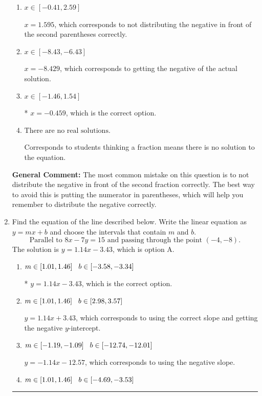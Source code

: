 \documentclass{extbook}[14pt]
\newcommand{\litem}[1]{\item #1

\rule{\textwidth}{0.4pt}}
\begin{document}
\begin{enumerate}
{\begin{enumerate}[label=\Alph*.]
$x = -1.595$, which corresponds to not distributing the negative in front of the first parentheses correctly.
\item \( x \in [-0.41, 2.59] \)

$x = 1.595$, which corresponds to not distributing the negative in front of the second parentheses correctly.
\item \( x \in [-8.43, -6.43] \)

$x = -8.429$, which corresponds to getting the negative of the actual solution.
\item \( x \in [-1.46, 1.54] \)

* $x = -0.459$, which is the correct option.
\item \( \text{There are no real solutions.} \)

Corresponds to students thinking a fraction means there is no solution to the equation.
\end{enumerate}

\textbf{General Comment:} The most common mistake on this question is to not distribute the negative in front of the second fraction correctly. The best way to avoid this is putting the numerator in parentheses, which will help you remember to distribute the negative correctly.
}
\litem{
Find the equation of the line described below. Write the linear equation as $ y=mx+b $ and choose the intervals that contain $m$ and $b$.
\[ \text{Parallel to } 8 x - 7 y = 15 \text{ and passing through the point } (-4, -8). \]The solution is \( y = 1.14x - 3.43 \), which is option A.\begin{enumerate}[label=\Alph*.]
\item \( m \in [1.01, 1.46] \hspace*{3mm} b \in [-3.58, -3.34] \)

* $y = 1.14x - 3.43$, which is the correct option.
\item \( m \in [1.01, 1.46] \hspace*{3mm} b \in [2.98, 3.57] \)

 $y = 1.14x + 3.43$, which corresponds to using the correct slope and getting the negative $y$-intercept.
\item \( m \in [-1.19, -1.09] \hspace*{3mm} b \in [-12.74, -12.01] \)

 $y = -1.14x - 12.57$, which corresponds to using the negative slope.
\item \( m \in [1.01, 1.46] \hspace*{3mm} b \in [-4.69, -3.53] \)


\end{enumerate}}
\end{enumerate}
\end{document}
